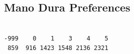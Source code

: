 \documentclass[12pt,]{article}
\newenvironment{Shaded}{\begin{snugshade}}{\end{snugshade}}
\newcommand{\CommentTok}[1]{\textcolor[rgb]{0.56,0.35,0.01}{\textit{#1}}}
\newcommand{\DecValTok}[1]{\textcolor[rgb]{0.00,0.00,0.81}{#1}}
\newcommand{\KeywordTok}[1]{\textcolor[rgb]{0.13,0.29,0.53}{\textbf{#1}}}
\newcommand{\NormalTok}[1]{#1}
\newcommand{\OperatorTok}[1]{\textcolor[rgb]{0.81,0.36,0.00}{\textbf{#1}}}
\begin{document}
\hypertarget{mano-dura-preferences}{%
\subsection{Mano Dura Preferences}\label{mano-dura-preferences}}

\begin{Shaded}
\end{Shaded}

\begin{verbatim}

-999    0    1    3    4    5 
 859  916 1423 1548 2136 2321 
\end{verbatim}
\end{document}
